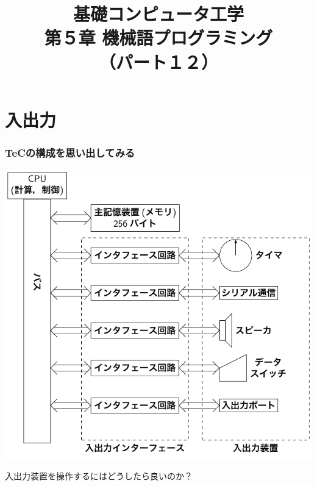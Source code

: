 \documentclass{beamer}                 %
\begin{document}
\title{基礎コンピュータ工学\\第５章 機械語プログラミング\\（パート１２）}
\date{}

\begin{frame}
  \titlepage
\end{frame}


\section{入出力}
\begin{frame}
  \frametitle{TeCの構成を思い出してみる}
  \centerline{\includegraphics[scale=0.67]{../Tikz/kousei2.pdf}}
  入出力装置を操作するにはどうしたら良いのか？
\end{frame}
\end{document}
